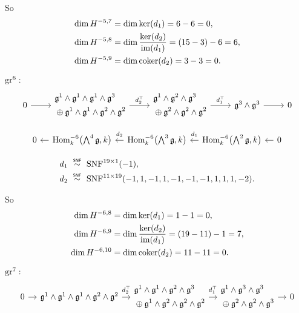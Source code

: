 So
\begin{align*}
  \dim H^{-5,7} &= \dim \operatorname{ker}(d_{1}) = 6-6 = 0, \\
  \dim H^{-5,8} &= \dim \dfrac{\operatorname{ker}(d_{2})}{\operatorname{im}(d_{1})} = (15-3) - 6 = 6, \\
  \dim H^{-5,9} &= \dim \operatorname{coker}(d_{2}) = 3 - 3 = 0.
\end{align*}

$\operatorname{gr}^{6}:$
\[
  \begin{tikzcd}[ampersand replacement=\&]
    0 \ar[r] \& \begin{aligned} &\lie{g}^{1} \wedge \lie{g}^{1} \wedge \lie{g}^{1} \wedge \lie{g}^{3} \\ &\oplus \lie{g}^{1} \wedge \lie{g}^{1} \wedge \lie{g}^{2} \wedge \lie{g}^{2} \end{aligned} \ar[r,"d_{2}^{\top}"] \& \begin{aligned} &\lie{g}^{1} \wedge \lie{g}^{2} \wedge \lie{g}^{3} \\ &\oplus \lie{g}^{2} \wedge \lie{g}^{2} \wedge \lie{g}^{2} \end{aligned} \ar[r,"d_{1}^{\top}"] \& \lie{g}^{3} \wedge \lie{g}^{3} \ar[r] \& 0
  \end{tikzcd}
\]

\[
  \begin{tikzcd}[column sep=1em]
    0 & \ar[l] \Hom_{k}^{-6}\bigl( \bigwedge^{4}\lie{g}, k \bigr) & \ar[l,"d_{2}"' {yshift=2pt}] \Hom_{k}^{-6}\bigl( \bigwedge^{3}\lie{g}, k \bigr) & \ar[l,"d_{1}"' {yshift=2pt}] \Hom_{k}^{-6}\bigl( \bigwedge^{2}\lie{g}, k \bigr) & \ar[l] 0
  \end{tikzcd}
\]

\begin{align*}
  d_{1} &\snfsim \SNF^{19\times1}(-1), \\
  d_{2} &\snfsim \SNF^{11\times19}(-1,1,-1,1,-1,-1,-1,1,1,1,-2).
\end{align*}

So
\begin{align*}
  \dim H^{-6,8} &= \dim \operatorname{ker}(d_{1}) = 1-1 = 0, \\
  \dim H^{-6,9} &= \dim \dfrac{\operatorname{ker}(d_{2})}{\operatorname{im}(d_{1})} = (19-11) - 1 = 7, \\
  \dim H^{-6,10} &= \dim \operatorname{coker}(d_{2}) = 11 - 11 = 0.
\end{align*}

$\operatorname{gr}^{7}:$
\[
  \begin{tikzcd}[ampersand replacement=\&, column sep=1em]
    0 \ar[r] \& \lie{g}^{1} \wedge \lie{g}^{1} \wedge \lie{g}^{1} \wedge \lie{g}^{2} \wedge \lie{g}^{2} \ar[r,"d_{2}^{\top}" {yshift=2pt}] \& \begin{aligned} &\lie{g}^{1} \wedge \lie{g}^{1} \wedge \lie{g}^{2} \wedge \lie{g}^{3} \\ &\oplus \lie{g}^{1} \wedge \lie{g}^{2} \wedge \lie{g}^{2} \wedge \lie{g}^{2} \end{aligned} \ar[r,"d_{1}^{\top}" {yshift=2pt}] \& \begin{aligned} &\lie{g}^{1} \wedge \lie{g}^{3} \wedge \lie{g}^{3} \\ &\oplus \lie{g}^{2} \wedge \lie{g}^{2} \wedge \lie{g}^{3} \end{aligned}\ar[r] \& 0
  \end{tikzcd}
\]


